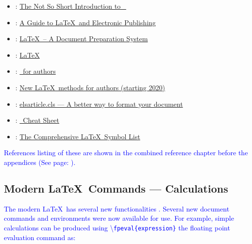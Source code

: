 \documentclass[phd,showframe]{ndsu-thesis-2022}
\newcommand\italk[1]{\textcolor{blue}{#1}}  %
\newcommand\cmd[1]{\textbackslash\texttt{#1}}  %
\begin{document}
\begin{itemize}
\setlength\itemindent{0.25in}
\item \citet{notso2021}:  \textcolor{magenta}{\href{http://tug.ctan.org/info/lshort/english/lshort.pdf}
{The Not So Short Introduction to \LaTeXe\ }}

\item \citet{kopka2004guide}:  \textcolor{magenta}{\href{https://www.math.ucdavis.edu/~tracy/courses/math129/Guide_To_LaTeX.pdf}
{A Guide to \LaTeX\ and Electronic Publishing}}

\item \citet{lamport94}: \textcolor{magenta}{\href{https://www.pearson.com/us/higher-education/program/Lamport-La-Te-X-A-Document-Preparation-System-2nd-Edition/PGM159713.html}
{\LaTeX\ -- A Document Preparation System}}

\item \citet{Wikibook2016}: \textcolor{magenta}{\href{http://upload.wikimedia.org/wikipedia/commons/2/2d/LaTeX.pdf}
{LaTeX}}

\item \citet{latxprojteam20}: \textcolor{magenta}{\href{https://www.latex-project.org/help/documentation/usrguide.pdf}
{\LaTeXe\ for authors}}

\item \citet{latxprojteam22}: \textcolor{magenta}{\href{https://www.latex-project.org/help/documentation/usrguide3.pdf}
{New \LaTeX\ methods for authors (starting 2020)}}

\item \citet{elsevier2020}: \textcolor{magenta}{\href{https://www.elsevier.com/authors/policies-and-guidelines/documents/elsdoc-1.pdf}
{elsarticle.cls --- A better way to format your document}}

\item \citet{Chang2014cheat}: \textcolor{magenta}{\href{https://wch.github.io/latexsheet/latexsheet.pdf}
{\LaTeXe\ Cheat Sheet}}

\item \citet{pakin2021comp}: \textcolor{magenta}{\href{https://tug.ctan.org/info/symbols/comprehensive/symbols-a4.pdf}
{The Comprehensive \LaTeX\ Symbol List}}
\end{itemize}

\italk{References listing of these are shown in the combined reference chapter before the appendices (See page: \pageref{biblio}).}

\subsection{Modern \LaTeX\ Commands --- Calculations}
\italk{The modern \LaTeX\ has several new functionalities \citep{latxprojteam22}. Several new document commands and environments were now available for use.  For example, simple calculations can be produced using \cmd{fpeval\{expression\}} the floating point evaluation command as:}
\end{document}
